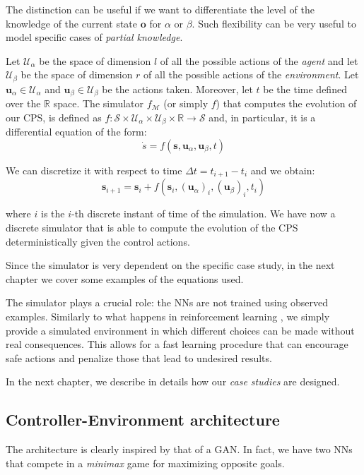 The distinction can be useful if we want to differentiate the level of the knowledge of the current state $\textbf{o}$ for $\alpha$ or $\beta$.
Such flexibility can be very useful to model specific cases of \textit{partial knowledge}.

Let $\mathcal{U}_\alpha$ be the space of dimension $l$ of all the possible actions of the \textit{agent} and let $\mathcal{U}_\beta$ be the space of dimension $r$ of all the possible actions of the \textit{environment}.
Let $\textbf{u}_\alpha \in \mathcal{U}_\alpha$ and $\textbf{u}_\beta \in \mathcal{U}_\beta$ be the actions taken.
Moreover, let $t$ be the time defined over the $\mathbb{R}$ space.
The simulator $f_\mathcal{M}$ (or simply $f$) that computes the evolution of our CPS, is defined as $f: \mathcal{S} \times \mathcal{U}_\alpha \times \mathcal{U}_\beta \times \mathbb{R} \to \mathcal{S}$ and, in particular, it is a differential equation of the form:
$$ \dot{s} = f(\textbf{s}, \textbf{u}_\alpha, \textbf{u}_\beta, t) $$

We can discretize it with respect to time $\Delta t = t_{i+1} - t_i$ and we obtain:
$$ \textbf{s}_{i+1} = \textbf{s}_i + f(\textbf{s}_i, (\textbf{u}_\alpha)_i, (\textbf{u}_\beta)_i, t_i) $$

where $i$ is the $i$-th discrete instant of time of the simulation.
We have now a discrete simulator that is able to compute the evolution of the CPS deterministically given the control actions.

Since the simulator is very dependent on the specific case study, in the next chapter we cover some examples of the equations used.

The simulator plays a crucial role: the NNs are not trained using observed examples.
Similarly to what happens in reinforcement learning \cite{reinforcementlearning}, we simply provide a simulated environment in which different choices can be made without real consequences.
This allows for a fast learning procedure that can encourage safe actions and penalize those that lead to undesired results.

In the next chapter, we describe in details how our \textit{case studies} are designed.

\subsection{Controller-Environment architecture}
The architecture is clearly inspired by that of a GAN.
In fact, we have two NNs that compete in a \textit{minimax} game for maximizing opposite goals.

